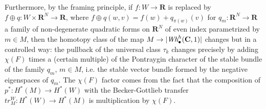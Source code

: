 \documentclass{amsart}
\def\bC{\mathbf{C}}
\def\bR{\mathbf{R}}
\theoremstyle{definition}
\theoremstyle{remark}
\newtheorem{inductive lemma}[theorem]{Inductive Lemma}
\begin{document}
 Furthermore, by the framing principle, if $f:W \to \bR$ is replaced by $f\oplus q : W \times \bR^N \to \bR$, where $f\oplus q(w,v)=f(w)+q_{\pi(w)} (v)$ for $q_m:\bR^N \to \bR$ a family of non-degenerate quadratic forms on $\bR^N$ of even index parametrized by $m \in M$, then the homotopy class of the map $M \to  |\text{\em Wh}_\bullet^h(\bC,1)| $ changes but in a controlled way: the pullback of the universal class $\tau_k$ changes precisely by adding $\chi(F)$ times a (certain multiple) of the Pontraygin character of the stable bundle of the family $q_m$, $m \in M$, i.e. the stable vector bundle formed by the negative eigenspaces of $q_m$. The $\chi(F)$ factor comes from the fact that the composition of $p^\ast:H^\ast(M)\to H^\ast(W)$ with the Becker-Gottlieb transfer $tr_M^W:H^\ast(W)\to H^\ast(M)$ is multiplication by $\chi(F)$.
 

\end{document}
